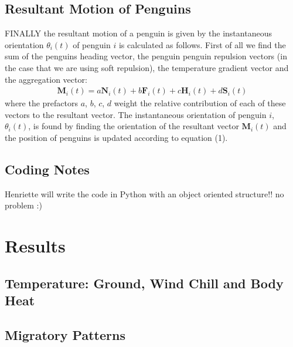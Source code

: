 \documentclass[]{scrartcl}
\newcommand{\tb}{\textbf}
\begin{document}
\subsection{Resultant Motion of Penguins}
FINALLY the resultant motion of a penguin is given by the instantaneous orientation $\theta_i(t)$ of penguin $i$ is calculated as follows. First of all we find the  sum of the penguins heading vector, the penguin penguin repulsion vectors (in the case that we are using soft repulsion), the temperature gradient vector and the aggregation vector: 
\begin{align}
\tb{M}_i (t)= a \tb{N}_i(t)  + b \tb{F}_i(t) + c \tb{H}_i(t) + d \tb{S}_i(t) 
\end{align}
where the prefactors $a$, $b$, $c$, $d$ weight the relative contribution of each of these vectors to the resultant vector. 
The instantaneous orientation of penguin $i$, $\theta_i(t)$, is found by finding the orientation of the resultant vector $\tb{M}_i(t)$ and the position of penguins is updated according to equation (1).

\subsection{Coding Notes}
Henriette will write the code in Python with an object oriented structure!!
no problem :)

\section{Results}
\subsection{Temperature: Ground, Wind Chill and Body Heat} 
\subsection{Migratory Patterns}
\end{document}
